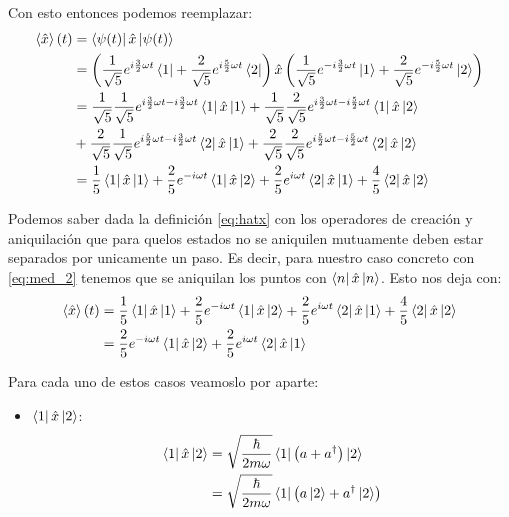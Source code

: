 \documentclass[12pt]{exam}
\begin{document}
\begin{enumerate}
		Con esto entonces podemos reemplazar:
		\begin{align}
			\left<\hat{x}\right>(t) &= \left<\psi(t)\right|\hat{x}\left|\psi(t)\right>\nonumber\\
			&= \left(\frac{1}{\sqrt{5}}e^{i\frac{3}{2}\omega t}\left<1\right| + \frac{2}{\sqrt{5}}e^{i\frac{5}{2}\omega t}\left<2\right|\right)\hat{x}\left(\frac{1}{\sqrt{5}}e^{-i\frac{3}{2}\omega t}\left|1\right> + \frac{2}{\sqrt{5}}e^{-i\frac{5}{2}\omega t}\left|2\right>\right)\nonumber\\
			&=
			\frac{1}{\sqrt{5}}\frac{1}{\sqrt{5}}e^{i\frac{3}{2}\omega t - i \frac{3}{2}\omega t}\left<1\right|\hat{x}\left|1\right> +
			\frac{1}{\sqrt{5}}\frac{2}{\sqrt{5}}e^{i\frac{3}{2}\omega t - i \frac{5}{2}\omega t}\left<1\right|\hat{x}\left|2\right>\nonumber\\
			&+ \frac{2}{\sqrt{5}}\frac{1}{\sqrt{5}}e^{i\frac{5}{2}\omega t - i \frac{3}{2}\omega t}\left<2\right|\hat{x}\left|1\right> +
			\frac{2}{\sqrt{5}}\frac{2}{\sqrt{5}}e^{i\frac{5}{2}\omega t - i \frac{5}{2}\omega t}\left<2\right|\hat{x}\left|2\right>\nonumber\\
			&=
			\frac{1}{5}\left<1\right|\hat{x}\left|1\right> +
			\frac{2}{5}e^{-i\omega t}\left<1\right|\hat{x}\left|2\right> +
			\frac{2}{5}e^{i\omega t}\left<2\right|\hat{x}\left|1\right> +
			\frac{4}{5}\left<2\right|\hat{x}\left|2\right>\label{eq:med_2}
		\end{align}

		Podemos saber dada la definición \ref{eq:hatx} con los operadores de creación y aniquilación que para quelos estados no se aniquilen mutuamente deben estar separados por unicamente un paso. Es decir, para nuestro caso concreto con \ref{eq:med_2} tenemos que se aniquilan los puntos con $\left<n\right|\hat{x}\left|n\right>$. Esto nos deja con:
		\begin{align}
			\left<\hat{x}\right>(t)
			&=
			\frac{1}{5}\left<1\right|\hat{x}\left|1\right> +
			\frac{2}{5}e^{-i\omega t}\left<1\right|\hat{x}\left|2\right> +
			\frac{2}{5}e^{i\omega t}\left<2\right|\hat{x}\left|1\right> +
			\frac{4}{5}\left<2\right|\hat{x}\left|2\right>\nonumber\\
			&=
			\frac{2}{5}e^{-i\omega t}\left<1\right|\hat{x}\left|2\right> +
			\frac{2}{5}e^{i\omega t}\left<2\right|\hat{x}\left|1\right>\label{eq:med_3}
		\end{align}

		Para cada uno de estos casos veamoslo por aparte:
		\begin{itemize}
			\item $\left<1\right|\hat{x}\left|2\right>$:
				\begin{align}
					\left<1\right|\hat{x}\left|2\right> &= \sqrt{\frac{\hbar}{2m\omega}}\left<1\right|\left(a + a^{\dagger}\right)\left|2\right>\nonumber\\
					&= \sqrt{\frac{\hbar}{2m\omega}}\left<1\right|\left(a\left|2\right> + a^{\dagger}\left|2\right>\right)\nonumber
				\end{align}


\end{itemize}
\end{enumerate}
\end{document}
